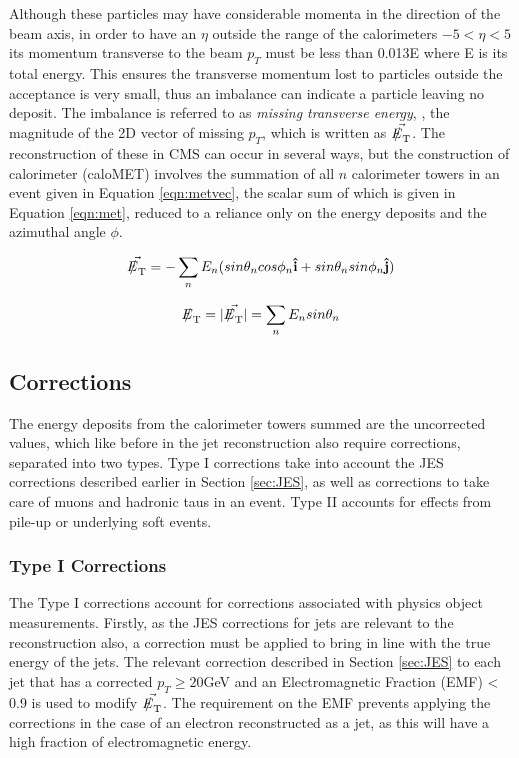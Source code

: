 Although these particles may have considerable momenta in the direction of the beam axis, in order to have an $\eta$ outside the range of the calorimeters $ -5 < \eta < 5$ its momentum transverse to the beam $p_{T}$ must be less than 0.013E where E is its total energy. This ensures the transverse momentum lost to particles outside the acceptance is very small, thus an imbalance can indicate a particle leaving no deposit. The imbalance is referred to as \textit{missing transverse energy}, \met, the magnitude of the 2D vector of missing $p_{T}$, which is written as $\vec{\met}$. The reconstruction of these in CMS can occur in several ways, but the construction of calorimeter \met  (caloMET) involves the summation of all $n$ calorimeter towers in an event given in Equation \ref{eqn:metvec}, the scalar sum of which is given in Equation \ref{eqn:met}, reduced to a reliance only on the energy deposits and the azimuthal angle $\phi$. 

\begin{equation}
\vec{\met} = - \sum_{n} E_{n} (sin \theta_{n} cos \phi_{n} \mathbf{\hat{i}} + sin \theta_{n} sin \phi_{n}  \mathbf{\hat{j}})
\label{eqn:metvec}
\end{equation}

\begin{equation}
\met = | \vec{\met} | = \sum_{n} E_{n} sin \theta_{n}
\label{eqn:met}
\end{equation}

\subsection{\met Corrections}

The energy deposits from the calorimeter towers summed are the uncorrected values, which like before in the jet reconstruction also require corrections, separated into two types. Type I corrections take into account the JES  corrections described earlier in Section \ref{sec:JES}, as well as corrections to take care of muons and hadronic taus in an event. Type II  accounts for effects from pile-up or underlying soft events.
 
\subsubsection{Type I Corrections}
The Type I corrections account for corrections associated with physics object measurements. Firstly, as the JES corrections for jets are relevant to the \met reconstruction also, a correction must be applied to bring \met in line with the true energy of the jets. The relevant correction described in Section \ref{sec:JES} to each jet that has a corrected $p_{T} \geq 20 $GeV and an Electromagnetic Fraction (EMF) < 0.9 is used to modify $\vec{\met}$. The requirement on the EMF prevents applying the corrections in the case of an electron reconstructed as a jet, as this will have a high fraction of electromagnetic  energy.

